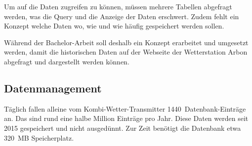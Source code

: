 \begin{table}[h!]
\caption{Vorhandene Daten in der Datenbank}
\label{table:db-tables}
\end{table}

\noindent
Um auf die Daten zugreifen zu können, müssen mehrere Tabellen abgefragt werden, was die Query und die Anzeige der Daten erschwert. Zudem fehlt ein Konzept welche Daten wo, wie und wie häufig gespeichert werden sollen.
\newline

\noindent
Während der Bachelor-Arbeit soll deshalb ein Konzept erarbeitet und umgesetzt werden, damit die historischen Daten auf der Webseite der Wetterstation Arbon abgefragt und dargestellt werden können.


\subsection{Datenmanagement}
Täglich fallen alleine vom Kombi-Wetter-Transmitter 1440~Datenbank-Einträge an. Das sind rund eine halbe Million Einträge pro Jahr. Diese Daten werden seit 2015 gespeichert und nicht ausgedünnt. Zur Zeit benötigt die Datenbank etwa 320~MB Speicherplatz.
\newline

